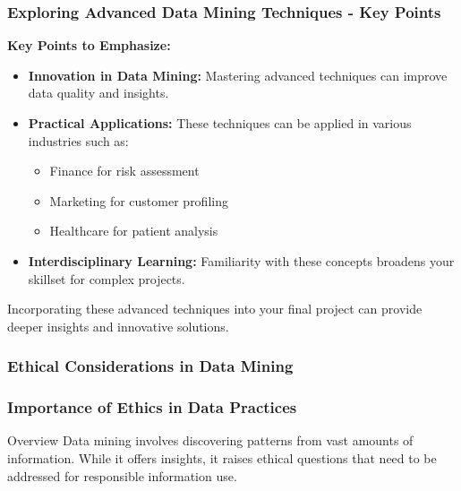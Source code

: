 \documentclass[aspectratio=169]{beamer}
\begin{document}
\begin{frame}[fragile]
    \frametitle{Exploring Advanced Data Mining Techniques - Key Points}
    \textbf{Key Points to Emphasize:}
    \begin{itemize}
        \item \textbf{Innovation in Data Mining:} Mastering advanced techniques can improve data quality and insights.
        \item \textbf{Practical Applications:} These techniques can be applied in various industries such as:
        \begin{itemize}
            \item Finance for risk assessment
            \item Marketing for customer profiling
            \item Healthcare for patient analysis
        \end{itemize}
        \item \textbf{Interdisciplinary Learning:} Familiarity with these concepts broadens your skillset for complex projects.
    \end{itemize}
    
    Incorporating these advanced techniques into your final project can provide deeper insights and innovative solutions.
\end{frame}

\begin{frame}[fragile]
    \frametitle{Ethical Considerations in Data Mining}
\end{frame}

\begin{frame}[fragile]
    \frametitle{Importance of Ethics in Data Practices}
    
    \begin{block}{Overview}
        Data mining involves discovering patterns from vast amounts of information. While it offers insights, it raises ethical questions that need to be addressed for responsible information use.
    \end{block}
\end{frame}
\end{document}
